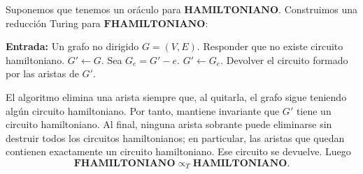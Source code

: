 \documentclass[12pt]{article}
\begin{document}
\begin{ejercicio}[1.3 puntos]
\begin{itemize}
            Suponemos que tenemos un oráculo para $\textbf{HAMILTONIANO}$. Construimos una reducción
            Turing para $\textbf{FHAMILTONIANO}$: 

            \begin{algorithm}
            \caption{Reducción Turing de $\textbf{FHAMILTONIANO}$ a $\textbf{HAMILTONIANO}$}
            \begin{algorithmic}
            \State \textbf{Entrada:} Un grafo no dirigido $G=(V,E)$.
                \State Responder que no existe circuito hamiltoniano.
            \EndIf
            \State $G'\gets G$.
                \State Sea $G_e=G'-e$.
                    \State $G'\gets G_e$.
                \EndIf
            \EndFor
            \State Devolver el circuito formado por las aristas de $G'$.
            \end{algorithmic}
            \end{algorithm}

            El algoritmo elimina una arista siempre que, al quitarla, el grafo sigue teniendo algún circuito
            hamiltoniano. Por tanto, mantiene invariante que $G'$ tiene un circuito hamiltoniano. Al final,
            ninguna arista sobrante puede eliminarse sin destruir todos los circuitos hamiltonianos; en
            particular, las aristas que quedan contienen exactamente un circuito hamiltoniano. Ese circuito
            se devuelve. Luego
            $$
            \textbf{FHAMILTONIANO} \propto_T \textbf{HAMILTONIANO}.
            $$

        \end{itemize}
    \end{ejercicio}
\end{document}
